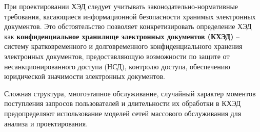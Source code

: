 \vspace{\baselineskip}
При проектировании ХЭД следует учитывать законодательно-нормативные требования, касающиеся информационной безопасности хранимых электронных документов. Это обстоятельство позволяет конкретизировать определение ХЭД как \textbf{конфиденциальное хранилище электронных документов (КХЭД)} – систему кратковременного и долговременного конфиденциального хранения электронных документов, предоставляющую возможности по защите от несанкционированного доступа (НСД), контролю доступа, обеспечению юридической значимости электронных документов. \cite{bib3}

\vspace{\baselineskip}
Сложная структура, многоэтапное обслуживание, случайный характер моментов поступления запросов пользователей и длительности их обработки в КХЭД предопределяют использование моделей сетей массового обслуживания для анализа и проектирования.








